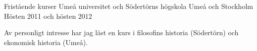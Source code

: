 \begin{cventries}
\cventry
{Frist{\aa}ende kurser} %
{Ume{\aa} universitet och S{\"o}dert{\"o}rns h{\"o}gskola} %
{Ume{\aa} och Stockholm} %
{H{\"o}sten 2011 och h{\"o}sten 2012} %
{ %
\begin{cvitems}
\item {Av personligt intresse har jag l{\"a}st en kurs i filosofins historia (S{\"o}dert{\"o}rn) och ekonomisk historia (Ume{\aa}).}
\end{cvitems}
}

\end{cventries}